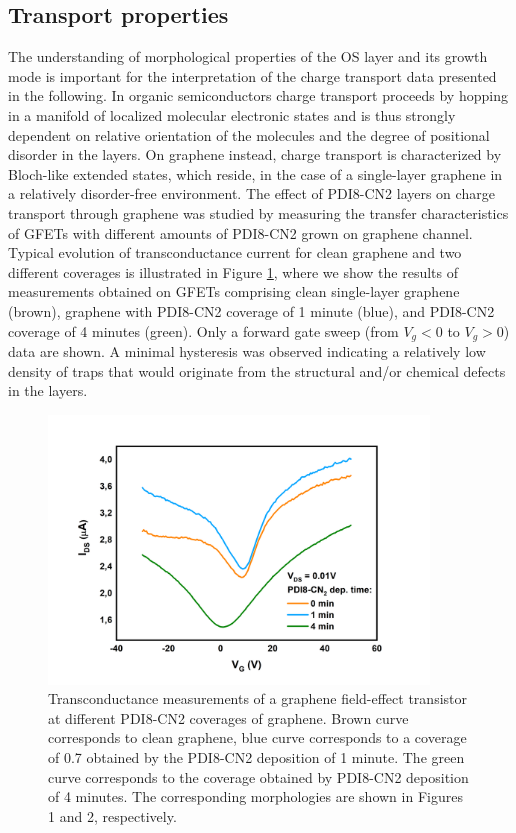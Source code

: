 \documentclass[review]{elsarticle}
\begin{document}
 \subsection{Transport properties}
\label{sec:tran}


The understanding of morphological properties of the OS layer and its growth mode is important for the interpretation of the charge transport data presented in the following.
  In organic semiconductors charge transport proceeds by hopping in a manifold of localized molecular electronic states and is thus strongly dependent on  relative orientation of the molecules and the degree of positional disorder in the layers.
  On graphene instead, charge transport is characterized by Bloch-like extended states, which reside, in the case of a single-layer graphene in a relatively disorder-free environment.
  The effect of PDI8-CN2 layers on charge transport through graphene was studied by measuring the transfer characteristics of GFETs with different amounts of PDI8-CN2 grown on graphene channel.
 Typical evolution of transconductance current for clean graphene and two different coverages is illustrated in Figure \ref{fig:3}, where we show the results of measurements  obtained on GFETs comprising clean single-layer graphene (brown), graphene with PDI8-CN2 coverage of 1 minute (blue), and  PDI8-CN2 coverage of 4 minutes (green).
 Only a forward gate sweep (from $V_g<0$ to $V_g>0$) data are shown.
 A minimal hysteresis was observed  indicating  a relatively low density of traps that would originate from the structural and/or chemical defects in the layers.



\begin{figure}[htb]
  \centering
   \includegraphics[width=0.9\textwidth]{./Figures/fig3}  
  \caption{Transconductance measurements of a graphene field-effect transistor at different PDI8-CN2 coverages of graphene.
 Brown curve corresponds to clean graphene, blue curve corresponds to a coverage of 0.7 obtained by the PDI8-CN2 deposition of 1 minute.
 The green curve corresponds to the coverage obtained by PDI8-CN2 deposition of 4 minutes.
 The corresponding morphologies are shown in Figures 1 and 2, respectively. 
 }
  \label{fig:3}
\end{figure}
\end{document}
